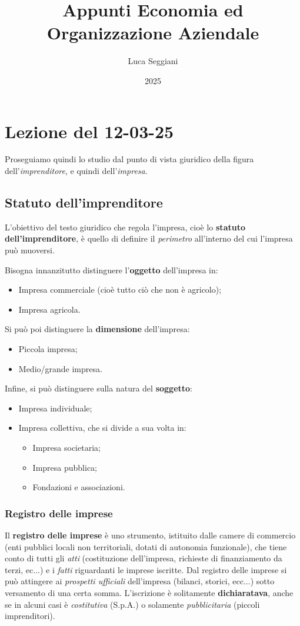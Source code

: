 \documentclass[a4paper,11pt]{article}
\title{Appunti Economia ed Organizzazione Aziendale}
\author{Luca Seggiani}
\date{2025}
\begin{document}
\section{Lezione del 12-03-25}

\thispagestyle{empty}
\pagestyle{fancy}

Proseguiamo quindi lo studio dal punto di vista giuridico della figura dell'\textit{imprenditore}, e quindi dell'\textit{impresa}.

\subsection{Statuto dell'imprenditore}
L'obiettivo del testo giuridico che regola l'impresa, cioè lo \textbf{statuto dell'imprenditore}, è quello di definire il \textit{perimetro} all'interno del cui l'impresa può muoversi.

Bisogna innanzitutto distinguere l'\textbf{oggetto} dell'impresa in:
\begin{itemize}
	\item Impresa commerciale (cioè tutto ciò che non è agricolo);
	\item Impresa agricola.
\end{itemize}
Si può poi distinguere la \textbf{dimensione} dell'impresa:
\begin{itemize}
	\item Piccola impresa; 
	\item Medio/grande impresa.
\end{itemize}
Infine, si può distinguere sulla natura del \textbf{soggetto}:
\begin{itemize}
	\item Impresa individuale;
	\item Impresa collettiva, che si divide a sua volta in:
		\begin{itemize}
			\item Impresa societaria;
			\item Impresa pubblica;
			\item Fondazioni e associazioni.
		\end{itemize}
\end{itemize}

\subsubsection{Registro delle imprese}
Il \textbf{registro delle imprese} è uno strumento, istituito dalle camere di commercio (enti pubblici locali non territoriali, dotati di autonomia funzionale), che tiene conto di tutti gli \textit{atti} (costituzione dell'impresa, richieste di finanziamento da terzi, ec...) e i \textit{fatti} riguardanti le imprese iscritte.
Dal registro delle imprese si può attingere ai \textit{prospetti ufficiali} dell'impresa (bilanci, storici, ecc...) sotto versamento di una certa somma.
L'iscrizione è solitamente \textbf{dichiaratava}, anche se in alcuni casi è \textit{costitutiva} (S.p.A.) o solamente \textit{pubblicitaria} (piccoli imprenditori).
\end{document}
